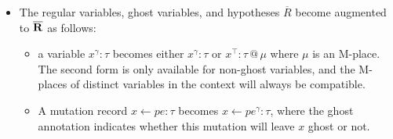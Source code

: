 \documentclass[acmsmall,nonacm]{acmart}
\begin{document}
\begin{itemize}
\item The regular variables, ghost variables, and hypotheses $\overline{R}$ become augmented to $\overline{\bf R}$ as follows:
  \begin{itemize}
  \item a variable $x^\gamma:\tau$ becomes either $x^\gamma:\tau$ or $x^{\top}:\tau\mathrel{@}\mu$ where $\mu$ is an M-place. The second form is only available for non-ghost variables, and the M-places of distinct variables in the context will always be compatible.
  \item A mutation record $x\gets pe:\tau$ becomes $x\gets pe^\gamma:\tau$, where the ghost annotation indicates whether this mutation will leave $x$ ghost or not.
  \end{itemize}
\end{itemize}
\end{document}
